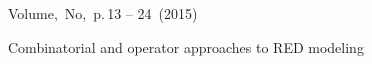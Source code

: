 \thispagestyle{empty}
\begin{heading}
{Volume,\, N{o},\, p.\,13 -- 24\, (2015)}
{}%
\end{heading}

\begin{Title}
Combinatorial and operator approaches to RED modeling
\end{Title}